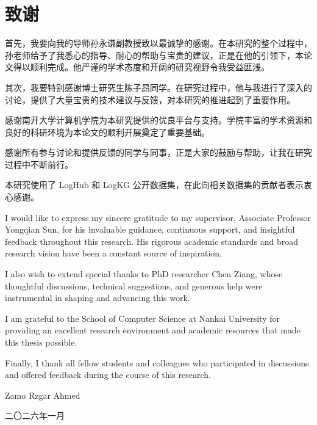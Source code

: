 
\chapter*{致谢}

首先，我要向我的导师孙永谦副教授致以最诚挚的感谢。在本研究的整个过程中，孙老师给予了我悉心的指导、耐心的帮助与宝贵的建议，正是在他的引领下，本论文得以顺利完成。他严谨的学术态度和开阔的研究视野令我受益匪浅。

其次，我要特别感谢博士研究生陈子昂同学。在研究过程中，他与我进行了深入的讨论，提供了大量宝贵的技术建议与反馈，对本研究的推进起到了重要作用。

感谢南开大学计算机学院为本研究提供的优良平台与支持。学院丰富的学术资源和良好的科研环境为本论文的顺利开展奠定了重要基础。

感谢所有参与讨论和提供反馈的同学与同事，正是大家的鼓励与帮助，让我在研究过程中不断前行。

本研究使用了 LogHub 和 LogKG 公开数据集，在此向相关数据集的贡献者表示衷心感谢。

\bigskip

I would like to express my sincere gratitude to my supervisor, Associate Professor Yongqian Sun,
for his invaluable guidance, continuous support, and insightful feedback throughout this research.
His rigorous academic standards and broad research vision have been a constant source of
inspiration.

I also wish to extend special thanks to PhD researcher Chen Ziang, whose thoughtful discussions,
technical suggestions, and generous help were instrumental in shaping and advancing this work.

I am grateful to the School of Computer Science at Nankai University for providing an excellent
research environment and academic resources that made this thesis possible.

Finally, I thank all fellow students and colleagues who participated in discussions and offered
feedback during the course of this research.

\vspace{2em}
\hfill Zamo Rzgar Ahmed

\hfill 二〇二六年一月
